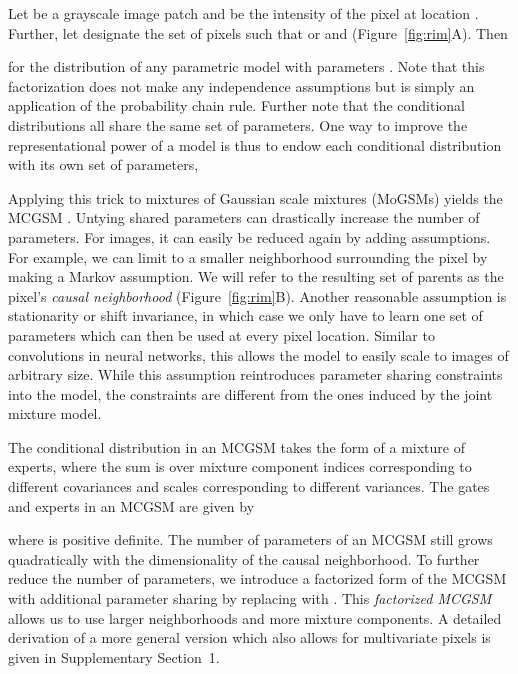 \documentclass{article}
\begin{document}
		Let  be a grayscale image patch and  be the intensity of the pixel at location
		. Further, let  designate the set of pixels  such that 
		or  and  (Figure~\ref{fig:rim}A). Then
		
		for the distribution of any parametric model with parameters . Note that this
		factorization does not make any independence assumptions but is simply an
		application of the probability chain rule. Further note that the conditional distributions
		all share the same set of parameters. One way to improve the
		representational power of a model is thus to endow each conditional distribution with its own set of parameters,
		
		Applying this trick to mixtures of Gaussian scale mixtures (MoGSMs) yields the MCGSM \cite{Theis:2011}.
		Untying shared parameters can drastically increase the number of parameters. For images, it
		can easily be reduced again by adding assumptions. For example, we can limit
		 to a smaller neighborhood surrounding the pixel by making a Markov
		assumption. We will refer to the resulting set of parents as the pixel's \textit{causal neighborhood} (Figure~\ref{fig:rim}B).
		Another reasonable assumption is stationarity or shift invariance, in which case we only have
		to learn one set of parameters  which can then be used at every pixel
		location. Similar to convolutions in neural networks, this allows the model to easily scale to images of arbitrary size.
		While this assumption reintroduces parameter sharing constraints into the model, the constraints are
		different from the ones induced by the joint mixture model.

		The conditional distribution in an MCGSM takes the form of a mixture of experts,
		where the sum is over mixture component indices  corresponding to different covariances
		and scales  corresponding to different variances.
		The gates and experts in an MCGSM are given by
		
		where  is positive definite. The number of parameters of an MCGSM still grows quadratically with
		the dimensionality of the causal neighborhood. To further reduce the number of parameters,
		we introduce a factorized form of the MCGSM with additional parameter sharing by replacing
		 with .
		This \textit{factorized MCGSM} allows us to use larger neighborhoods and more mixture components.
		A detailed derivation of a more general version which also allows for multivariate pixels is given in
		Supplementary Section~1.
\end{document}
